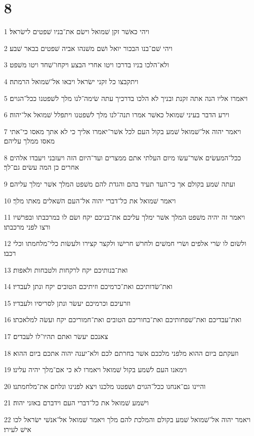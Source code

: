 \chapter{8}

\par 1 ויהי כאשׁר זקן שׁמואל וישׂם את־בניו שׁפטים לישׂראל׃
\par 2 ויהי שׁם־בנו הבכור יואל ושׁם משׁנהו אביה שׁפטים בבאר שׁבע׃
\par 3 ולא־הלכו בניו בדרכו ויטו אחרי הבצע ויקחו־שׁחד ויטו משׁפט׃
\par 4 ויתקבצו כל זקני ישׂראל ויבאו אל־שׁמואל הרמתה׃
\par 5 ויאמרו אליו הנה אתה זקנת ובניך לא הלכו בדרכיך עתה שׂימה־לנו מלך לשׁפטנו ככל־הגוים׃
\par 6 וירע הדבר בעיני שׁמואל כאשׁר אמרו תנה־לנו מלך לשׁפטנו ויתפלל שׁמואל אל־יהוה׃
\par 7 ויאמר יהוה אל־שׁמואל שׁמע בקול העם לכל אשׁר־יאמרו אליך כי לא אתך מאסו כי־אתי מאסו ממלך עליהם׃
\par 8 ככל־המעשׂים אשׁר־עשׂו מיום העלתי אתם ממצרים ועד־היום הזה ויעזבני ויעבדו אלהים אחרים כן המה עשׂים גם־לך׃
\par 9 ועתה שׁמע בקולם אך כי־העד תעיד בהם והגדת להם משׁפט המלך אשׁר ימלך עליהם׃
\par 10 ויאמר שׁמואל את כל־דברי יהוה אל־העם השׁאלים מאתו מלך׃
\par 11 ויאמר זה יהיה משׁפט המלך אשׁר ימלך עליכם את־בניכם יקח ושׂם לו במרכבתו ובפרשׁיו ורצו לפני מרכבתו׃
\par 12 ולשׂום לו שׂרי אלפים ושׂרי חמשׁים ולחרשׁ חרישׁו ולקצר קצירו ולעשׂות כלי־מלחמתו וכלי רכבו׃
\par 13 ואת־בנותיכם יקח לרקחות ולטבחות ולאפות׃
\par 14 ואת־שׂדותיכם ואת־כרמיכם וזיתיכם הטובים יקח ונתן לעבדיו׃
\par 15 וזרעיכם וכרמיכם יעשׂר ונתן לסריסיו ולעבדיו׃
\par 16 ואת־עבדיכם ואת־שׁפחותיכם ואת־בחוריכם הטובים ואת־חמוריכם יקח ועשׂה למלאכתו׃
\par 17 צאנכם יעשׂר ואתם תהיו־לו לעבדים׃
\par 18 וזעקתם ביום ההוא מלפני מלככם אשׁר בחרתם לכם ולא־יענה יהוה אתכם ביום ההוא׃
\par 19 וימאנו העם לשׁמע בקול שׁמואל ויאמרו לא כי אם־מלך יהיה עלינו׃
\par 20 והיינו גם־אנחנו ככל־הגוים ושׁפטנו מלכנו ויצא לפנינו ונלחם את־מלחמתנו׃
\par 21 וישׁמע שׁמואל את כל־דברי העם וידברם באזני יהוה׃
\par 22 ויאמר יהוה אל־שׁמואל שׁמע בקולם והמלכת להם מלך ויאמר שׁמואל אל־אנשׁי ישׂראל לכו אישׁ לעירו׃

